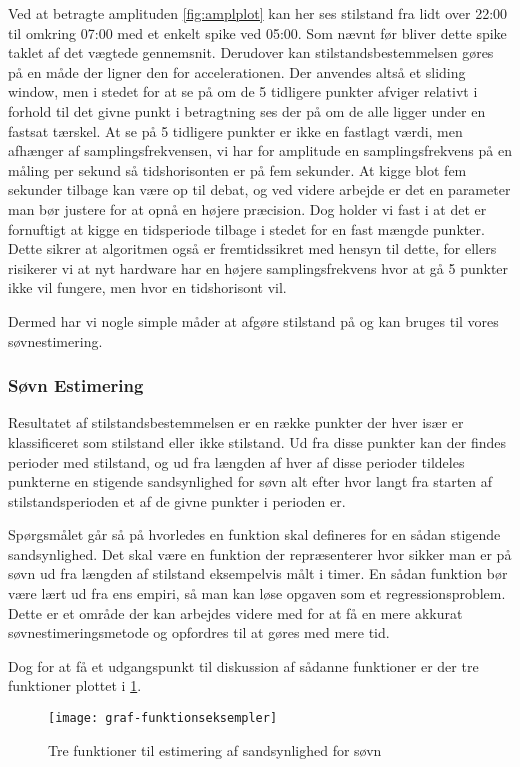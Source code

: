 Ved at betragte amplituden \cref{fig:amplplot} kan her ses stilstand fra lidt over 22:00 til omkring 07:00 med et enkelt spike ved 05:00.
Som nævnt før bliver dette spike taklet af det vægtede gennemsnit.
Derudover kan stilstandsbestemmelsen gøres på en måde der ligner den for accelerationen.
Der anvendes altså et sliding window, men i stedet for at se på om de 5 tidligere punkter afviger relativt i forhold til det givne punkt i betragtning ses der på om de alle ligger under en fastsat tærskel.
At se på 5 tidligere punkter er ikke en fastlagt værdi, men afhænger af samplingsfrekvensen, vi har for amplitude en samplingsfrekvens på en måling per sekund så tidshorisonten er på fem sekunder.
At kigge blot fem sekunder tilbage kan være op til debat, og ved videre arbejde er det en parameter man bør justere for at opnå en højere præcision.
Dog holder vi fast i at det er fornuftigt at kigge en tidsperiode tilbage i stedet for en fast mængde punkter.
Dette sikrer at algoritmen også er fremtidssikret med hensyn til dette, for ellers risikerer vi at nyt hardware har en højere samplingsfrekvens hvor at gå 5 punkter ikke vil fungere, men hvor en tidshorisont vil.

Dermed har vi nogle simple måder at afgøre stilstand på og kan bruges til vores søvnestimering.
\subsubsection{Søvn Estimering}
Resultatet af stilstandsbestemmelsen er en række punkter der hver især er klassificeret som stilstand eller ikke stilstand.
Ud fra disse punkter kan der findes perioder med stilstand, og ud fra længden af hver af disse perioder tildeles punkterne en stigende sandsynlighed for søvn alt efter hvor langt fra starten af stilstandsperioden et af de givne punkter i perioden er.


Spørgsmålet går så på hvorledes en funktion skal defineres for en sådan stigende sandsynlighed.
Det skal være en funktion der repræsenterer hvor sikker man er på søvn ud fra længden af stilstand eksempelvis målt i timer.
En sådan funktion bør være lært ud fra ens empiri, så man kan løse opgaven som et regressionsproblem.
Dette er et område der kan arbejdes videre med for at få en mere akkurat søvnestimeringsmetode og opfordres til at gøres med mere tid.

Dog for at få et udgangspunkt til diskussion af sådanne funktioner er der tre funktioner plottet i \cref{fig:trefunc}.
\begin{figure}[h]
	\centering
	\texttt{[image: graf-funktionseksempler]}
	\caption{Tre funktioner til estimering af sandsynlighed for søvn}\label{fig:trefunc}
\end{figure}

